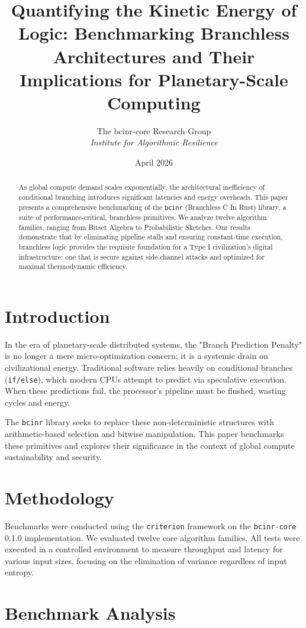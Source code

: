 \documentclass[twocolumn, 10pt]{article}
\title{\textbf{Quantifying the Kinetic Energy of Logic: Benchmarking Branchless Architectures and Their Implications for Planetary-Scale Computing}}
\author{
    The bcinr-core Research Group \\
    \textit{Institute for Algorithmic Resilience}
}
\date{April 2026}
\begin{document}
\maketitle

\begin{abstract}
As global compute demand scales exponentially, the architectural inefficiency of conditional branching introduces significant latencies and energy overheads. This paper presents a comprehensive benchmarking of the \texttt{bcinr} (Branchless C In Rust) library, a suite of performance-critical, branchless primitives. We analyze twelve algorithm families, ranging from Bitset Algebra to Probabilistic Sketches. Our results demonstrate that by eliminating pipeline stalls and ensuring constant-time execution, branchless logic provides the requisite foundation for a Type I civilization's digital infrastructure: one that is secure against side-channel attacks and optimized for maximal thermodynamic efficiency.
\end{abstract}

\section{Introduction}
In the era of planetary-scale distributed systems, the "Branch Prediction Penalty" is no longer a mere micro-optimization concern; it is a systemic drain on civilizational energy. Traditional software relies heavily on conditional branches (\texttt{if/else}), which modern CPUs attempt to predict via speculative execution. When these predictions fail, the processor's pipeline must be flushed, wasting cycles and energy.

The \texttt{bcinr} library seeks to replace these non-deterministic structures with arithmetic-based selection and bitwise manipulation. This paper benchmarks these primitives and explores their significance in the context of global compute sustainability and security.

\section{Methodology}
Benchmarks were conducted using the \texttt{criterion} framework on the \texttt{bcinr-core} 0.1.0 implementation. We evaluated twelve core algorithm families. All tests were executed in a controlled environment to measure throughput and latency for various input sizes, focusing on the elimination of variance regardless of input entropy.

\section{Benchmark Analysis}
\end{document}
